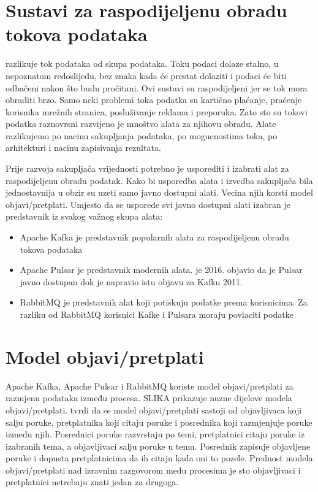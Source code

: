 \documentclass[times, utf8, diplomski, numeric]{fer}
\begin{document}
\chapter{Sustavi za raspodijeljenu obradu tokova podataka}

\citep{ilprints535} razlikuje tok podataka od skupa podataka. Toku podaci dolaze stalno, u nepoznatom redoslijedu, bez znaka kada će prestat dolaziti i podaci će biti odbačeni nakon što budu pročitani. Ovi sustavi su raspodijeljeni jer se tok mora obraditi brzo. Samo neki problemi toka podatka su kartično plaćanje, praćenje korisnika mrežnih stranica, posluživanje reklama i preporuka. Zato sto su tokovi podatka raznovrsni razvijeno je mnoštvo alata za njihovu obradu. Alate razlikujemo po nacinu sakupljanja podataka, po mogucnostima toka, po arhitekturi i nacinu zapisivanja rezultata.

Prije razvoja sakupljača vrijednosti potrebno je usporediti i izabrati alat za raspodijeljenu obradu podatak. Kako bi usporedba alata i izvedba sakupljača bila jednostavnija u obzir su uzeti samo javno dostupni alati. Vecina njih korsti model objavi/pretplati. Umjesto da se usporede svi javno dostupni alati izabran je predstavnik iz svakog važnog skupa alata:
\begin{itemize}
  \item Apache Kafka je predstavnik popularnih alata za raspodijeljenu obradu tokova podataka
  \item Apache Pulsar je predstavnik modernih alata. \citep{yahoo-blogpost} je 2016. objavio da je Pulsar javno dostupan dok je \citep{kafka-whitepaper} napravio istu objavu za Kafku 2011.
  \item RabbitMQ je predstavnik alat koji potiskuju podatke prema korisnicima. Za razliku od RabbitMQ korisnici Kafke i Pulsara moraju povlaciti podatke
\end{itemize}

\chapter{Model objavi/pretplati}
Apache Kafka, Apache Pulsar i RabbitMQ koriste model objavi/pretplati za razmjenu podataka između procesa. SLIKA prikazuje nuzne dijelove modela objavi/pretplati. \citep{rassus-manual} tvrdi da se model objavi/pretplati sastoji od objavljivaca koji salju poruke, pretplatnika koji citaju poruke i posrednika koji razmjenjuje poruke izmedu njih. Posrednici poruke razvrstaju po temi, pretplatnici citaju poruke iz izabranih tema, a objavljivaci salju poruke u temu. Posrednik zapisuje objavljene poruke i dopusta pretplatnicima da ih citaju kada oni to pozele. Prednost modela objavi/pretplati nad izravnim razgovorom medu procesima je sto objavljivaci i pretplatnici netrebaju znati jedan za drugoga. 
\end{document}
